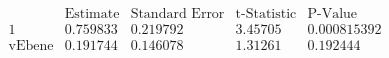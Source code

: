 \[\begin{array}{l|llll}
 \text{} & \text{Estimate} & \text{Standard Error} & \text{t-Statistic} & \text{P-Value} \\
\hline
 1 & 0.759833 & 0.219792 & 3.45705 & 0.000815392 \\
 \text{vEbene} & 0.191744 & 0.146078 & 1.31261 & 0.192444 \\
\end{array}\]

